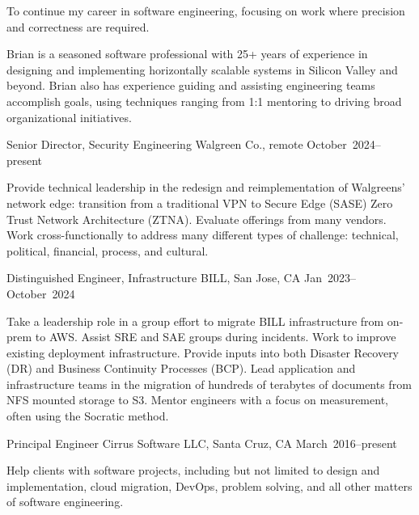 \documentclass{resume}
\begin{document}
\begin{resume}
\begin{Objective}
To continue my career in software engineering, focusing on work where precision and correctness are required. 
\end{Objective}

\begin{Profile}
Brian is a seasoned software professional with 25+ years of experience
in designing and implementing horizontally scalable systems in Silicon
Valley and beyond. Brian also has experience guiding and assisting
engineering teams accomplish goals, using techniques ranging from 1:1
mentoring to driving broad organizational initiatives.
\end{Profile}

\begin{Employment}
\begin{job}{Senior Director, Security Engineering}
           {Walgreen Co., remote}
           {October~2024--present}

Provide technical leadership in the redesign and reimplementation of
Walgreens' network edge: transition from a traditional VPN to Secure
Edge (SASE) Zero Trust Network Architecture (ZTNA). Evaluate offerings
from many vendors. Work cross-functionally to address many different
types of challenge: technical, political, financial, process, and
cultural.
           
\end{job}

\begin{job}{Distinguished Engineer, Infrastructure}
           {BILL, San Jose, CA}
           {Jan~2023--October~2024}

Take a leadership role in a group effort to migrate BILL
infrastructure from on-prem to AWS. Assist SRE and SAE groups during
incidents. Work to improve existing deployment infrastructure. Provide
inputs into both Disaster Recovery (DR) and Business Continuity
Processes (BCP). Lead application and infrastructure teams in the
migration of hundreds of terabytes of documents from NFS mounted
storage to S3. Mentor engineers with a focus on measurement, often
using the Socratic method.

\end{job}

\begin{job}{Principal Engineer}
           {Cirrus Software LLC, Santa Cruz, CA}
           {March~2016--present}

Help clients with software projects, including but not limited to design and implementation, cloud migration, DevOps, problem solving, and all other matters of software engineering.


\end{job}
\end{Employment}
\end{resume}
\end{document}
